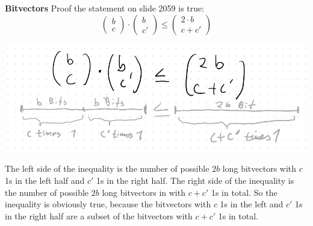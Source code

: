 \question \textbf{Bitvectors}
Proof the statement on slide 2059 is true:
\begin{equation}
\begin{pmatrix}
b\\c
\end{pmatrix}
\cdot
\begin{pmatrix}
b\\c'
\end{pmatrix}
\leq
\begin{pmatrix}
2\cdot b\\c + c'
\end{pmatrix}
\end{equation}



\begin{solution}

\includegraphics[width=0.5\linewidth]{task_3/a3.png}

The left side of the inequality is the number of possible $2b$ long bitvectors with $c$ 1s in the left half and $c'$ 1s in the right half. The right side of the inequality is the number of possible $2b$ long bitvectors in with $c+c'$ 1s in total. So the inequality is obviously true, because the bitvectors with $c$ 1s in the left and $c'$ 1s in the right half are a subset of the bitvectors with $c+c'$ 1s in total.
\end{solution}
